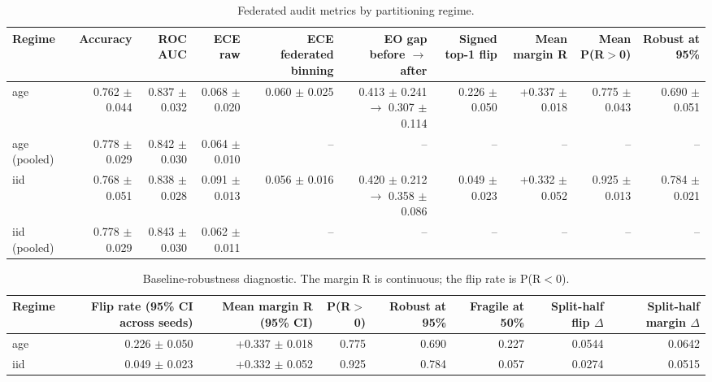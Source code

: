 \begin{table}[t]
\centering
\small
\begin{tabular}{lrrrrrrrrr}
\toprule
Regime & Accuracy & ROC AUC & ECE raw & ECE federated binning & EO gap before $\rightarrow$ after & Signed top-1 flip & Mean margin R & Mean P(R$>$0) & Robust at 95\% \\
\midrule
age & 0.762 $\pm$ 0.044 & 0.837 $\pm$ 0.032 & 0.068 $\pm$ 0.020 & 0.060 $\pm$ 0.025 & 0.413 $\pm$ 0.241 $\rightarrow$ 0.307 $\pm$ 0.114 & 0.226 $\pm$ 0.050 & +0.337 $\pm$ 0.018 & 0.775 $\pm$ 0.043 & 0.690 $\pm$ 0.051 \\
age (pooled) & 0.778 $\pm$ 0.029 & 0.842 $\pm$ 0.030 & 0.064 $\pm$ 0.010 & -- & -- & -- & -- & -- & -- \\
iid & 0.768 $\pm$ 0.051 & 0.838 $\pm$ 0.028 & 0.091 $\pm$ 0.013 & 0.056 $\pm$ 0.016 & 0.420 $\pm$ 0.212 $\rightarrow$ 0.358 $\pm$ 0.086 & 0.049 $\pm$ 0.023 & +0.332 $\pm$ 0.052 & 0.925 $\pm$ 0.013 & 0.784 $\pm$ 0.021 \\
iid (pooled) & 0.778 $\pm$ 0.029 & 0.843 $\pm$ 0.030 & 0.062 $\pm$ 0.011 & -- & -- & -- & -- & -- & -- \\
\bottomrule
\end{tabular}
\caption{Federated audit metrics by partitioning regime.}
\label{tab:regimes}
\end{table}

\begin{table}[t]
\centering
\small
\begin{tabular}{lrrrrrrr}
\toprule
Regime & Flip rate (95\% CI across seeds) & Mean margin R (95\% CI) & P(R$>$0) & Robust at 95\% & Fragile at 50\% & Split-half flip $\Delta$ & Split-half margin $\Delta$ \\
\midrule
age & 0.226 $\pm$ 0.050 & +0.337 $\pm$ 0.018 & 0.775 & 0.690 & 0.227 & 0.0544 & 0.0642 \\
iid & 0.049 $\pm$ 0.023 & +0.332 $\pm$ 0.052 & 0.925 & 0.784 & 0.057 & 0.0274 & 0.0515 \\
\bottomrule
\end{tabular}
\caption{Baseline-robustness diagnostic. The margin R is continuous; the flip rate is P(R$<$0).}
\label{tab:robustness}
\end{table}

